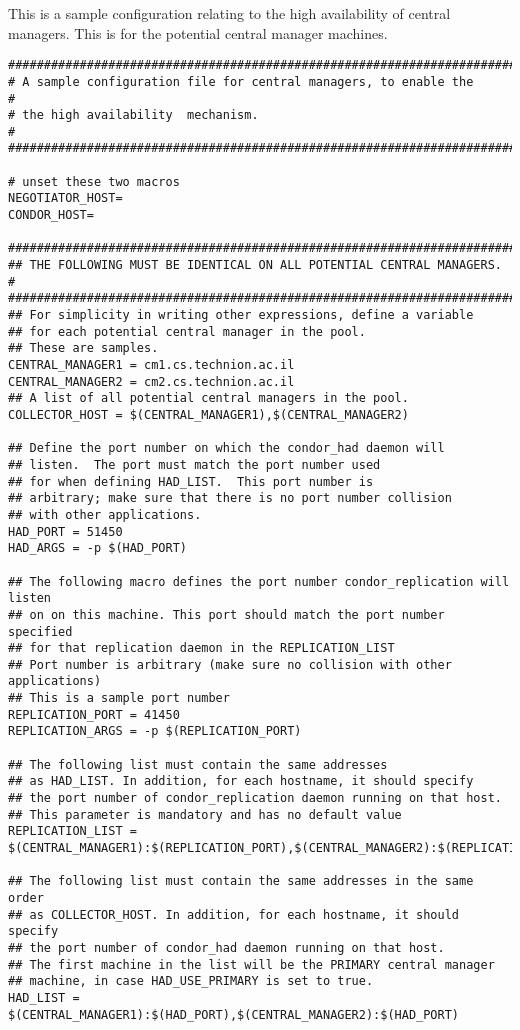 This is a sample configuration relating to the 
high availability of central managers.
This is for the potential central manager machines.

\footnotesize
\begin{verbatim}
##########################################################################
# A sample configuration file for central managers, to enable the        #
# the high availability  mechanism.                                      #
##########################################################################

# unset these two macros 
NEGOTIATOR_HOST=
CONDOR_HOST=

#########################################################################
## THE FOLLOWING MUST BE IDENTICAL ON ALL POTENTIAL CENTRAL MANAGERS.   # 
#########################################################################
## For simplicity in writing other expressions, define a variable
## for each potential central manager in the pool. 
## These are samples.
CENTRAL_MANAGER1 = cm1.cs.technion.ac.il
CENTRAL_MANAGER2 = cm2.cs.technion.ac.il
## A list of all potential central managers in the pool.
COLLECTOR_HOST = $(CENTRAL_MANAGER1),$(CENTRAL_MANAGER2)

## Define the port number on which the condor_had daemon will
## listen.  The port must match the port number used
## for when defining HAD_LIST.  This port number is
## arbitrary; make sure that there is no port number collision
## with other applications.
HAD_PORT = 51450
HAD_ARGS = -p $(HAD_PORT)

## The following macro defines the port number condor_replication will listen
## on on this machine. This port should match the port number specified
## for that replication daemon in the REPLICATION_LIST
## Port number is arbitrary (make sure no collision with other applications)
## This is a sample port number
REPLICATION_PORT = 41450
REPLICATION_ARGS = -p $(REPLICATION_PORT)

## The following list must contain the same addresses
## as HAD_LIST. In addition, for each hostname, it should specify 
## the port number of condor_replication daemon running on that host.
## This parameter is mandatory and has no default value
REPLICATION_LIST = $(CENTRAL_MANAGER1):$(REPLICATION_PORT),$(CENTRAL_MANAGER2):$(REPLICATION_PORT)

## The following list must contain the same addresses in the same order 
## as COLLECTOR_HOST. In addition, for each hostname, it should specify 
## the port number of condor_had daemon running on that host.
## The first machine in the list will be the PRIMARY central manager
## machine, in case HAD_USE_PRIMARY is set to true.
HAD_LIST = $(CENTRAL_MANAGER1):$(HAD_PORT),$(CENTRAL_MANAGER2):$(HAD_PORT)



\end{verbatim}
